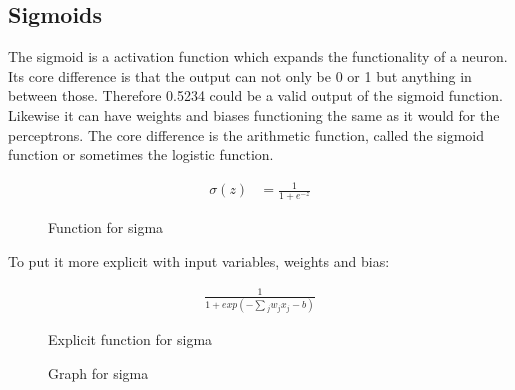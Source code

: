 \subsection{Sigmoids}
The sigmoid is a activation function which expands the functionality of a neuron. Its core difference is that the output can not only be 0 or 1
but anything in between those. Therefore 0.5234 could be a valid output of the sigmoid function. Likewise it can
have weights and biases functioning the same as it would for the perceptrons.
The core difference is the arithmetic function, called the sigmoid function or sometimes the logistic function.
\begin{figure}[H]
    \begin{equation*}
        \begin{split}
            \sigma(z) & = \frac{1}{1+e^{-z}}
        \end{split}
    \end{equation*} 
    \caption{Function for sigma}
\end{figure}
\vspace{0.25cm}
To put it more explicit with input variables, weights and bias:
\begin{figure}[H]
    \begin{equation*}
        \begin{split}
            \frac{1}{1+exp(-\sum{_j}{w_jx_j-b})}
        \end{split}
    \end{equation*}
    \caption{Explicit function for sigma}
\end{figure}
\vspace{0.25cm}
\begin{figure}[H]
\begin{center}
    \caption{Graph for sigma}
\end{center}
\end{figure}

